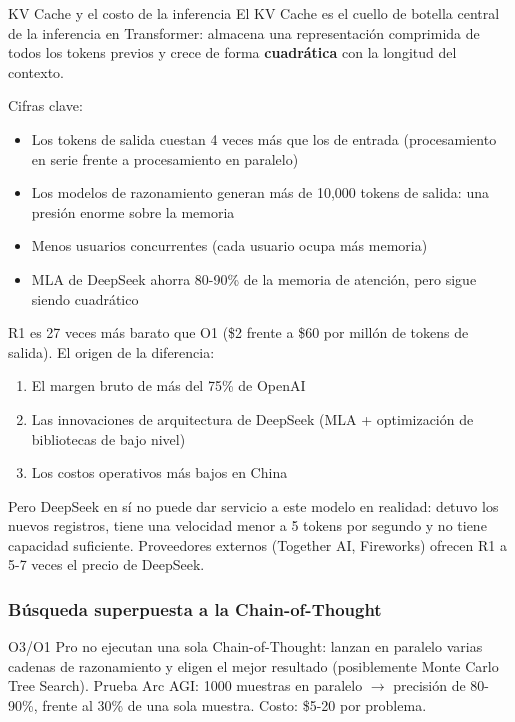 \documentclass[a4paper]{article}
\begin{document}
\begin{knowledgebox}{KV Cache y el costo de la inferencia}
El KV Cache es el cuello de botella central de la inferencia en Transformer: almacena una representación comprimida de todos los tokens previos y crece de forma \textbf{cuadrática} con la longitud del contexto.

Cifras clave:
\begin{itemize}
    \item Los tokens de salida cuestan 4 veces más que los de entrada (procesamiento en serie frente a procesamiento en paralelo)
    \item Los modelos de razonamiento generan más de 10,000 tokens de salida: una presión enorme sobre la memoria
    \item Menos usuarios concurrentes (cada usuario ocupa más memoria)
    \item MLA de DeepSeek ahorra 80-90\% de la memoria de atención, pero sigue siendo cuadrático
\end{itemize}

R1 es 27 veces más barato que O1 (\$2 frente a \$60 por millón de tokens de salida). El origen de la diferencia:
\begin{enumerate}
    \item El margen bruto de más del 75\% de OpenAI
    \item Las innovaciones de arquitectura de DeepSeek (MLA + optimización de bibliotecas de bajo nivel)
    \item Los costos operativos más bajos en China
\end{enumerate}

Pero DeepSeek en sí no puede dar servicio a este modelo en realidad: detuvo los nuevos registros, tiene una velocidad menor a 5 tokens por segundo y no tiene capacidad suficiente. Proveedores externos (Together AI, Fireworks) ofrecen R1 a 5-7 veces el precio de DeepSeek.
\end{knowledgebox}

\subsubsection{Búsqueda superpuesta a la Chain-of-Thought}

O3/O1 Pro no ejecutan una sola Chain-of-Thought: lanzan en paralelo varias cadenas de razonamiento y eligen el mejor resultado (posiblemente Monte Carlo Tree Search). Prueba Arc AGI: 1000 muestras en paralelo $\to$ precisión de 80-90\%, frente al 30\% de una sola muestra. Costo: \$5-20 por problema.
\end{document}
